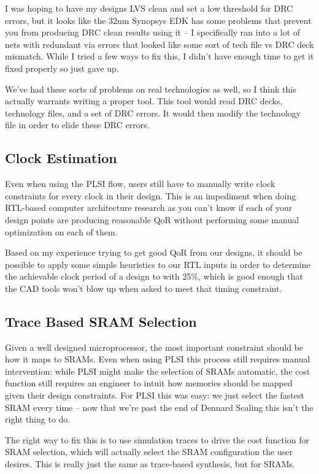 \documentclass{article}
\begin{document}
I was hoping to have my designs LVS clean and set a low threshold for DRC
errors, but it looks like the 32nm Synopsys EDK has some problems that prevent
you from producing DRC clean results using it -- I specifically ran into a lot
of nets with redundant via errors that looked like some sort of tech file vs
DRC deck mismatch.  While I tried a few ways to fix this, I didn't have enough
time to get it fixed properly so just gave up.

We've had these sorts of problems on real technologies as well, so I think this
actually warrants writing a proper tool.  This tool would read DRC decks,
technology files, and a set of DRC errors.  It would then modify the technology
file in order to elide these DRC errors.

\subsection{Clock Estimation}

Even when using the PLSI flow, users still have to manually write clock
constraints for every clock in their design.  This is an impediment when doing
RTL-based computer architecture research as you can't know if each of your
design points are producing reasonable QoR without performing some manual
optimization on each of them.

Based on my experience trying to get good QoR from our designs, it should be
possible to apply some simple heuristics to our RTL inputs in order to
determine the achievable clock period of a design to with 25\%, which is good
enough that the CAD tools won't blow up when asked to meet that timing
constraint.

\subsection{Trace Based SRAM Selection}

Given a well designed microprocessor, the most important constraint should be
how it maps to SRAMs.  Even when using PLSI this process still requires manual
intervention: while PLSI might make the selection of SRAMs automatic, the cost
function still requires an engineer to intuit how memories should be mapped
given their design constraints.  For PLSI this was easy: we just select the
fastest SRAM every time -- now that we're past the end of Dennard Scaling this
isn't the right thing to do.

The right way to fix this is to use simulation traces to drive the cost
function for SRAM selection, which will actually select the SRAM configuration
the user desires.  This is really just the same as trace-based synthesis, but
for SRAMs.
\end{document}
